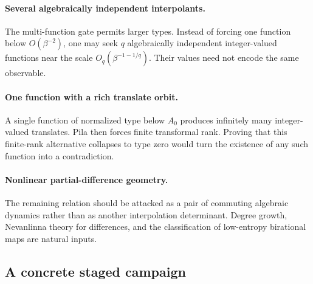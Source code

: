 \documentclass[11pt,oneside]{article}
\theoremstyle{definition}
\theoremstyle{remark}
\begin{document}
\paragraph{Several algebraically independent interpolants.}
The multi-function gate permits larger types.  Instead of forcing one function below
$O(\beta^{-2})$, one may seek $q$ algebraically independent integer-valued functions near
the scale $O_q(\beta^{-1-1/q})$.  Their values need not encode the same observable.

\paragraph{One function with a rich translate orbit.}
A single function of normalized type below $A_0$ produces infinitely many integer-valued
translates.  Pila then forces finite transformal rank.  Proving that this finite-rank
alternative collapses to type zero would turn the existence of any such function into a
contradiction.

\paragraph{Nonlinear partial-difference geometry.}
The remaining relation should be attacked as a pair of commuting algebraic dynamics rather
than as another interpolation determinant.  Degree growth, Nevanlinna theory for differences,
and the classification of low-entropy birational maps are natural inputs.

\subsection{A concrete staged campaign}
\end{document}

